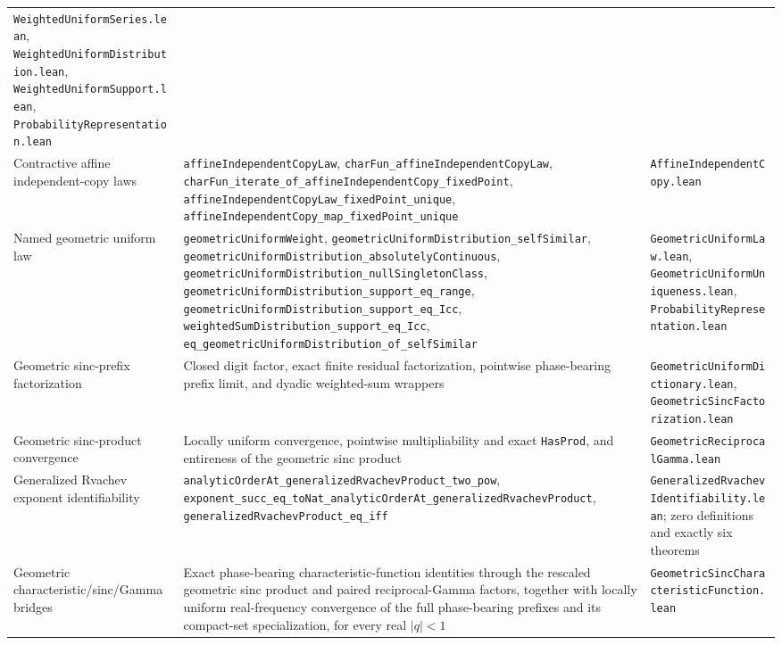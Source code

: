 \documentclass[11pt,oneside]{article}
\theoremstyle{definition}
\theoremstyle{remark}
\begin{document}
\begin{longtable}{@{}p{}p{}p{}@{}}
\nolinkurl{WeightedUniformSeries.lean}, \nolinkurl{WeightedUniformDistribution.lean},
\nolinkurl{WeightedUniformSupport.lean}, \nolinkurl{ProbabilityRepresentation.lean} \\
Contractive affine independent-copy laws &
\nolinkurl{affineIndependentCopyLaw},
\nolinkurl{charFun_affineIndependentCopyLaw},
\nolinkurl{charFun_iterate_of_affineIndependentCopy_fixedPoint},
\nolinkurl{affineIndependentCopyLaw_fixedPoint_unique},
\nolinkurl{affineIndependentCopy_map_fixedPoint_unique} &
\nolinkurl{AffineIndependentCopy.lean} \\
Named geometric uniform law &
\nolinkurl{geometricUniformWeight},
\nolinkurl{geometricUniformDistribution_selfSimilar},
\nolinkurl{geometricUniformDistribution_absolutelyContinuous},
\nolinkurl{geometricUniformDistribution_nullSingletonClass},
\nolinkurl{geometricUniformDistribution_support_eq_range},
\nolinkurl{geometricUniformDistribution_support_eq_Icc},
\nolinkurl{weightedSumDistribution_support_eq_Icc},
\nolinkurl{eq_geometricUniformDistribution_of_selfSimilar} &
\nolinkurl{GeometricUniformLaw.lean}, \nolinkurl{GeometricUniformUniqueness.lean},
\nolinkurl{ProbabilityRepresentation.lean} \\
Geometric sinc-prefix factorization &
Closed digit factor, exact finite residual factorization, pointwise phase-bearing prefix
limit, and dyadic weighted-sum wrappers &
\nolinkurl{GeometricUniformDictionary.lean},
\nolinkurl{GeometricSincFactorization.lean} \\
Geometric sinc-product convergence &
Locally uniform convergence, pointwise multipliability and exact \nolinkurl{HasProd}, and
entireness of the geometric sinc product &
\nolinkurl{GeometricReciprocalGamma.lean} \\
Generalized Rvachev exponent identifiability &
\nolinkurl{analyticOrderAt_generalizedRvachevProduct_two_pow},
\nolinkurl{exponent_succ_eq_toNat_analyticOrderAt_generalizedRvachevProduct},
\nolinkurl{generalizedRvachevProduct_eq_iff} &
\nolinkurl{GeneralizedRvachevIdentifiability.lean}; zero definitions and
exactly six theorems \\
Geometric characteristic/sinc/Gamma bridges &
Exact phase-bearing characteristic-function identities through the rescaled geometric sinc
product and paired reciprocal-Gamma factors, together with locally uniform real-frequency
convergence of the full phase-bearing prefixes and its compact-set specialization, for every
real \(\lvert q\rvert<1\) &
\nolinkurl{GeometricSincCharacteristicFunction.lean} \\

\end{longtable}
\end{document}
